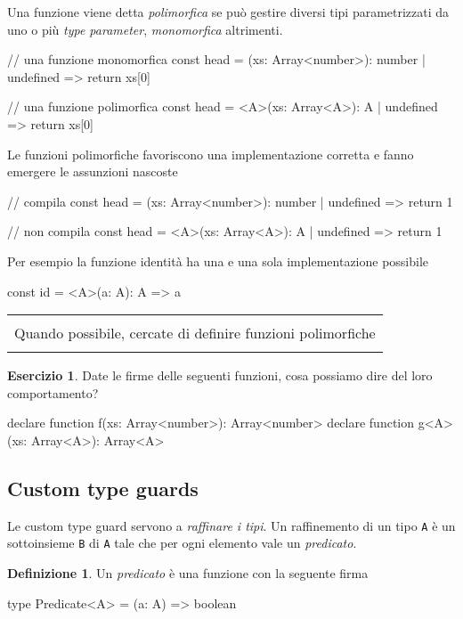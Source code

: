 \documentclass[12pt]{article}
\theoremstyle{definition}
\newtheorem{definition}{Definizione}[section]
\newtheorem{exercise}{Esercizio}[subsection]
\newenvironment{boxed}
    {\begin{center}
    \begin{tabular}{|p{0.9\textwidth}|}
    \hline\\
    }
    {
    \\\\\hline
    \end{tabular}
    \end{center}
    }
\newenvironment{code}
  {\vspace{0.5cm} \VerbatimEnvironment\begin{typescriptcode}}
  {\end{typescriptcode} \vspace{0.2cm}}
\begin{document}
Una funzione viene detta \emph{polimorfica} se può gestire diversi tipi parametrizzati da uno o più \emph{type parameter},
\emph{monomorfica} altrimenti.

\begin{code}
// una funzione monomorfica
const head = (xs: Array<number>): number | undefined => {
  return xs[0]
}

// una funzione polimorfica
const head = <A>(xs: Array<A>): A | undefined => {
  return xs[0]
}
\end{code}

Le funzioni polimorfiche favoriscono una implementazione corretta e fanno emergere le assunzioni nascoste

\begin{code}
// compila
const head = (xs: Array<number>): number | undefined => {
  return 1
}

// non compila
const head = <A>(xs: Array<A>): A | undefined => {
  return 1
}
\end{code}

Per esempio la funzione identità ha una e una sola implementazione possibile

\begin{code}
const id = <A>(a: A): A => a
\end{code}

\begin{boxed}
Quando possibile, cercate di definire funzioni polimorfiche
\end{boxed}

\begin{exercise}
Date le firme delle seguenti funzioni, cosa possiamo dire del loro comportamento?

\begin{code}
declare function f(xs: Array<number>): Array<number>
declare function g<A>(xs: Array<A>): Array<A>
\end{code}
\end{exercise}

\subsection{Custom type guards}

Le custom type guard servono a \emph{raffinare i tipi}. Un raffinemento di un tipo \texttt{A} è un sottoinsieme \texttt{B} di \texttt{A}
tale che per ogni elemento vale un \emph{predicato}.

\begin{definition}
Un \emph{predicato} è una funzione con la seguente firma

\begin{code}
type Predicate<A> = (a: A) => boolean
\end{code}
\end{definition}
\end{document}
